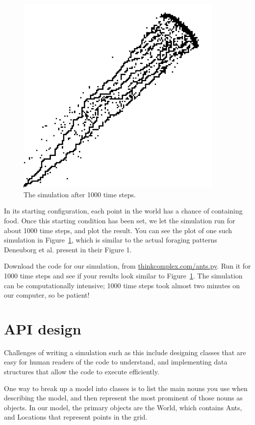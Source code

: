 \documentclass[10pt]{book}
\begin{document}
\begin{figure}[ht]
\centerline{\includegraphics[width=4.0in]{figs/plot.png}}
\caption{The simulation after 1000 time steps.\label{fig.plot}}
\end{figure}

In its starting configuration, each point in the world has a chance of
containing food. Once this starting condition has been set, we let the
simulation run for about 1000 time steps, and plot the result. You can
see the plot of one such simulation in Figure~\ref{fig.plot}, which is
similar to the actual foraging patterns
Deneuborg et al. present in their Figure 1.


\begin{exercise}

Download the code for our simulation, from
\url{thinkcomplex.com/ants.py}.  Run it for 1000 time steps and see if
your results look similar to Figure~\ref{fig.plot}. The simulation can
be computationally intensive; 1000 time steps took almost two
minutes on our computer, so be patient!
\end{exercise}


\section{API design}

Challenges of writing a simulation such as this include designing
classes that are easy for human readers of the code to
understand, and implementing data structures that allow the
code to execute efficiently.

One way to break up a model into classes is to list the main nouns you
use when describing the model, and then represent the most prominent
of those nouns as objects. In our model, the primary objects are the
World, which contains Ants, and Locations that represent points in
the grid.
\end{document}
